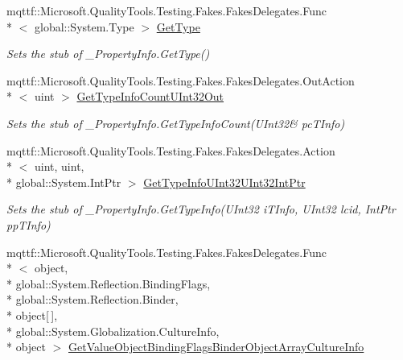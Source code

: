 \begin{DoxyCompactItemize}
mqttf\-::\-Microsoft.\-Quality\-Tools.\-Testing.\-Fakes.\-Fakes\-Delegates.\-Func\\*
$<$ global\-::\-System.\-Type $>$ \hyperlink{class_system_1_1_runtime_1_1_interop_services_1_1_fakes_1_1_stub___property_info_a5eec4408c6dfdf9eeee32ba2ec8a272a}{Get\-Type}
\begin{DoxyCompactList}\small\item\em Sets the stub of \-\_\-\-Property\-Info.\-Get\-Type()\end{DoxyCompactList}\item 
mqttf\-::\-Microsoft.\-Quality\-Tools.\-Testing.\-Fakes.\-Fakes\-Delegates.\-Out\-Action\\*
$<$ uint $>$ \hyperlink{class_system_1_1_runtime_1_1_interop_services_1_1_fakes_1_1_stub___property_info_aa710a29cceeba7d447d4d53d561657e1}{Get\-Type\-Info\-Count\-U\-Int32\-Out}
\begin{DoxyCompactList}\small\item\em Sets the stub of \-\_\-\-Property\-Info.\-Get\-Type\-Info\-Count(U\-Int32\& pc\-T\-Info)\end{DoxyCompactList}\item 
mqttf\-::\-Microsoft.\-Quality\-Tools.\-Testing.\-Fakes.\-Fakes\-Delegates.\-Action\\*
$<$ uint, uint, \\*
global\-::\-System.\-Int\-Ptr $>$ \hyperlink{class_system_1_1_runtime_1_1_interop_services_1_1_fakes_1_1_stub___property_info_a5e1fe97d2cb114dcdaa46c3659aba750}{Get\-Type\-Info\-U\-Int32\-U\-Int32\-Int\-Ptr}
\begin{DoxyCompactList}\small\item\em Sets the stub of \-\_\-\-Property\-Info.\-Get\-Type\-Info(\-U\-Int32 i\-T\-Info, U\-Int32 lcid, Int\-Ptr pp\-T\-Info)\end{DoxyCompactList}\item 
mqttf\-::\-Microsoft.\-Quality\-Tools.\-Testing.\-Fakes.\-Fakes\-Delegates.\-Func\\*
$<$ object, \\*
global\-::\-System.\-Reflection.\-Binding\-Flags, \\*
global\-::\-System.\-Reflection.\-Binder, \\*
object\mbox{[}$\,$\mbox{]}, \\*
global\-::\-System.\-Globalization.\-Culture\-Info, \\*
object $>$ \hyperlink{class_system_1_1_runtime_1_1_interop_services_1_1_fakes_1_1_stub___property_info_a67b6d38d44c79d4516e88b8aa8bd77e9}{Get\-Value\-Object\-Binding\-Flags\-Binder\-Object\-Array\-Culture\-Info}

\end{DoxyCompactItemize}
